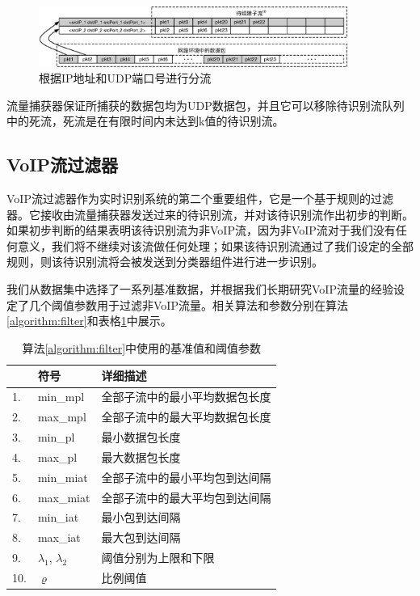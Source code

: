 \begin{figure}[htp]
\begin{center}
\includegraphics[width=0.9\textwidth]{figures/flow.eps}
\caption{根据IP地址和UDP端口号进行分流}\label{fig:flow}
\end{center}
\end{figure}

流量捕获器保证所捕获的数据包均为UDP数据包，并且它可以移除待识别流队列中的死流，死流是在有限时间内未达到k值的待识别流。

\subsection{VoIP流过滤器}
VoIP流过滤器作为实时识别系统的第二个重要组件，它是一个基于规则的过滤器。它接收由流量捕获器发送过来的待识别流，并对该待识别流作出初步的判断。如果初步判断的结果表明该待识别流为非VoIP流，因为非VoIP流对于我们没有任何意义，我们将不继续对该流做任何处理；如果该待识别流通过了我们设定的全部规则，则该待识别流将会被发送到分类器组件进行进一步识别。

我们从数据集中选择了一系列基准数据，并根据我们长期研究VoIP流量的经验设定了几个阈值参数用于过滤非VoIP流量。相关算法和参数分别在算法\ref{algorithm:filter}和表格\ref{tab:rules}中展示。

\begin{table}[htbp]
  \caption{算法\ref{algorithm:filter}中使用的基准值和阈值参数}
  \label{tab:rules}
  \centering
  \begin{tabular}{l l l}
    \hline
    \textbf{} & \textbf{符号} & \textbf{详细描述}\\
    \hline
    1. & min\_mpl      &   全部子流中的最小平均数据包长度\\
    2. & max\_mpl      &  全部子流中的最大平均数据包长度\\
    3. & min\_pl      &   最小数据包长度\\
    4. & max\_pl      &   最大数据包长度\\
    5. & min\_miat      &   全部子流中的最小平均包到达间隔\\
    6. & max\_miat      &   全部子流中的最大平均包到达间隔\\
    7. & min\_iat      &   最小包到达间隔\\
    8. & max\_iat      &  最大包到达间隔\\
    9. & ${\lambda_1}$, ${\lambda_2}$      &  阈值分别为上限和下限 \\
    10. & ${\varrho}$    &   比例阈值\\
    \hline
  \end{tabular}
\end{table}

